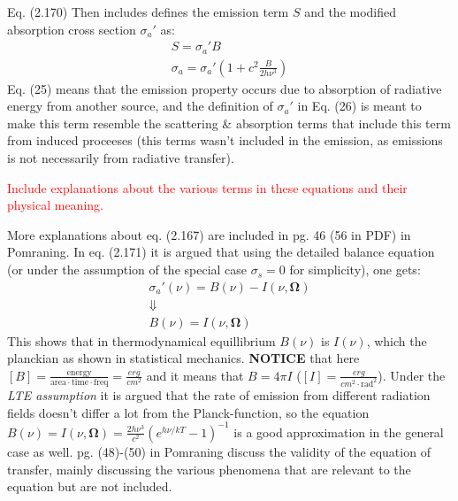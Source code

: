 \documentclass[15pt]{article}
\begin{document}
Eq. (2.170) Then includes defines the emission term $S$ and the modified absorption cross section $\sigma_a'$ as:
\begin{gather}
    S = \sigma_a'B\label{S} \\
    \sigma_a = \sigma_a' (1 + c^2 \frac{B}{2h\nu^3})
\end{gather}
Eq. (25) means that the emission property occurs due to absorption of radiative energy from another source, and the definition of $\sigma_a'$ in Eq. (26) is meant to make this term resemble the scattering \& absorption terms that include this term from induced proceeses (this terms wasn't included in the emission, as emissions is not necessarily from radiative transfer).


\textcolor{red}{Include explanations about the various terms in these equations and their physical meaning.}

More explanations about eq. (2.167) are included in pg. 46 (56 in PDF) in Pomraning.
In eq. (2.171) it is argued that using the detailed balance equation (or under the assumption of the special case $\sigma_s = 0$ for simplicity), one gets:
\begin{gather}
    \sigma_a'(\nu) = B(\nu) - I(\nu,\bm\Omega) \\
    \Downarrow \\ B(\nu) = I(\nu,\bm\Omega)
\end{gather}
This shows that in thermodynamical equillibrium $B(\nu)$ is $I(\nu)$, which the planckian as shown in statistical mechanics. \textbf{NOTICE} that here $[B]=\frac{\text{energy}}{\text{area}\cdot\text{time}\cdot\text{freq}}=\frac{erg}{cm^2}$ and it means that $B=4\pi I$ ($[I]=\frac{erg}{cm^2\cdot\text{rad}^2}$). 
Under the \textit{LTE assumption} it is argued that the rate of emission from different radiation fields doesn't differ a lot from the Planck-function, so the equation $B(\nu) = I(\nu,\bm\Omega)=\frac{2h\nu^3}{c^2}(e^{h\nu/kT}-1)^{-1}$ is a good approximation in the general case as well. 
pg. (48)-(50) in Pomraning discuss the validity of the equation of transfer, mainly discussing the various phenomena that are relevant to the equation but are not included.
\end{document}
